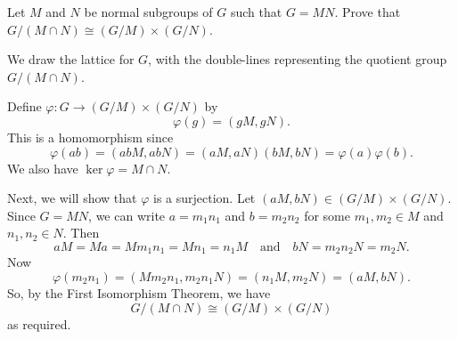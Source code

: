  Let $M$ and $N$ be normal subgroups of $G$ such that
$G = MN$. Prove that $G/(M\cap N)\cong(G/M)\times(G/N)$.
\begin{solution}
  We draw the lattice for $G$, with the double-lines representing the
  quotient group $G/(M\cap N)$.
  \begin{center}
  \end{center}
  Define $\varphi\colon G\to(G/M)\times(G/N)$ by
  \begin{equation*}
    \varphi(g) = (gM, gN).
  \end{equation*}
  This is a homomorphism since
  \begin{equation*}
    \varphi(ab) = (abM, abN) = (aM, aN)(bM, bN) = \varphi(a)\varphi(b).
  \end{equation*}
  We also have $\ker\varphi = M\cap N$.

  Next, we will show that $\varphi$ is a surjection. Let
  $(aM, bN)\in(G/M)\times(G/N)$. Since $G = MN$, we can write
  $a = m_1n_1$ and $b = m_2n_2$ for some $m_1,m_2\in M$ and
  $n_1,n_2\in N$. Then
  \begin{equation*}
    aM = Ma = Mm_1n_1 = Mn_1 = n_1M
    \quad\text{and}\quad
    bN = m_2n_2N = m_2N.
  \end{equation*}
  Now
  \begin{equation*}
    \varphi(m_2n_1)
    = (Mm_2n_1, m_2n_1N)
    = (n_1M, m_2N)
    = (aM, bN).
  \end{equation*}
  So, by the First Isomorphism Theorem, we have
  \begin{equation*}
    G/(M\cap N)\cong(G/M)\times(G/N)
  \end{equation*}
  as required.
\end{solution}


